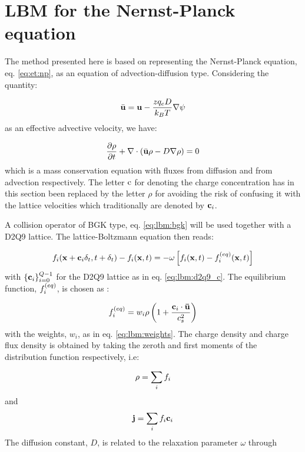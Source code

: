 \section{LBM for the Nernst-Planck equation}\label{sec:lbm:np}
The method presented here is based on representing the Nernst-Planck
equation, eq. \eqref{eq:et:np}, as an equation of advection-diffusion
type. Considering the quantity:  

\begin{equation}\label{eq:lbm:eff_adv}
\bar{\mathbf{u}} = \mathbf{u} -
  \frac{zq_eD}{k_BT}\nabla\mathrm{\psi}
\end{equation}
as an effective advective velocity, we have:

\begin{equation}\label{eq:lbm:adv-dif}
\dfrac{\partial \rho}{\partial t} + \nabla \cdot ( \bar{\mathbf{u}} \rho -
  D\nabla \rho ) = 0
\end{equation}
which is a mass conservation equation with fluxes from diffusion and
from advection respectively. The letter $\mathrm{c}$ for denoting the charge
concentration has in this section been replaced by the letter $\rho$
for avoiding the risk of confusing it with the lattice velocities
which traditionally are denoted by ${\mathbf{c}_i}$.

A collision operator of BGK type, eq. \eqref{eq:lbm:bgk} will be used
together with a D2Q9 lattice. The lattice-Boltzmann equation then
reads:

\begin{equation}
f_i(\mathbf{x} + \mathbf{c}_i\delta_t, t + \delta_t) - f_i(\mathbf{x}, t) = -\omega \left[ f_i(\mathbf{x}, t) - f_i^{(eq)}(\mathbf{x}, t) \right]
\end{equation}
with $\{\mathbf{c}_i\}_{i=0}^{Q-1}$ for the D2Q9 lattice as in
eq. \eqref{eq:lbm:d2q9_c}. The equilibrium function, $f_i^{(eq)}$, is chosen
as \cite{alexey-tobias}:

\begin{equation}\label{eq:lbm:np_feq}
f_i^{(eq)} = w_i \rho \left ( 1 + \frac{\mathbf{c}_i \cdot \mathbf{\bar{u}}}{c_s^2} \right)
\end{equation}
with the weights, $w_i$, as in eq. \eqref{eq:lbm:weights}. The charge
density and charge flux density is obtained by taking the zeroth and
first moments of the distribution function respectively, i.e:

\begin{equation}\label{eq:lbm:rho_mom}
\mathrm{\rho} = \sum_i f_i
\end{equation}
and
\begin{equation}\label{eq:lbm:j_mom}
\mathbf{j} = \sum_i f_i \mathbf{c}_i
\end{equation}
The diffusion constant, $D$, is related to the relaxation parameter
$\omega$ through 

